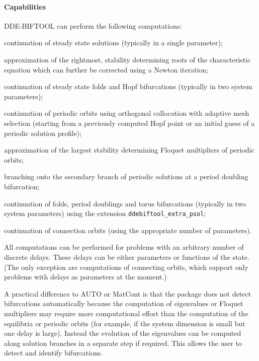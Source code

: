 \documentclass[10pt]{scrartcl}
\newcommand{\DDEBIFCODE}{\textsc{DDE-BIFTOOL}}
\begin{document}
\paragraph{Capabilities}
{\DDEBIFCODE} can perform the following computations:
\begin{compactitem}
\item continuation of steady state solutions (typically in a single
  parameter);
\item approximation of the rightmost, stability determining roots of
  the characteristic equation which can further be corrected using a
  Newton iteration;
\item continuation of steady state folds and Hopf bifurcations
  (typically in two system parameters);
\item continuation of periodic orbits using orthogonal collocation
  with adaptive mesh selection (starting from a previously computed
  Hopf point or an initial guess of a periodic solution profile);
\item approximation of the largest stability determining Floquet
  multipliers of periodic orbits;
\item branching onto the secondary branch of periodic solutions at a
  period doubling bifurcation;
\item continuation of folds, period doublings and torus bifurcations
  (typically in two system parameters) using the extension
  \texttt{ddebiftool\_extra\_psol};
\item continuation of connection orbits (using the appropriate number
  of parameters).  
\end{compactitem}
All computations can be performed for problems with an arbitrary
number of discrete delays. These delays can be either parameters or
functions of the state.
(The only exception are computations of connecting orbits, which
support only problems with delays as parameters at the moment.)

A practical difference to AUTO or MatCont is that the package does not detect
bifurcations automatically because the computation of eigenvalues or
Floquet multipliers may require more computational effort than the
computation of the equilibria or periodic orbits (for example, if the
system dimension is small but one delay is large). Instead the
evolution of the eigenvalues can be computed along solution branches
in a separate step if required. This allows the user to detect and
identify bifurcations.
\end{document}
